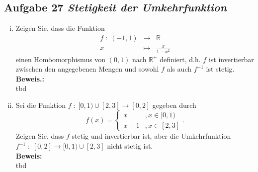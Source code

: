 \subsection*{Aufgabe 27 \mdseries\itshape Stetigkeit der Umkehrfunktion}

\begin{enumerate}[(i)]
   \item Zeigen Sie, dass die Funktion 
        $$\begin{array}{rcl}
            f \; : \; (-1,1) &\longrightarrow& \mathbb{R}\\
                x & \mapsto & \frac{x}{1 - x^2}
        \end{array}$$
        einen Homöomorphismus von $(0,1)$ nach $\mathbb{R}^+$ definiert, d.h. 
        $f$ ist invertierbar zwischen den angegebenen Mengen und sowohl $f$ als auch
        $f^{-1}$ ist stetig.\\

    \textbf{Beweis.:}\\
        tbd

    \item Sei die Funktion $f \; : \; [0,1) \cup [2,3] \rightarrow [0,2]$ gegeben durch
        $$
            f(x) = \left\{ \begin{array}{lr}
                x &, x\in [0,1)\\
                x-1 &, x \in [2,3]
            \end{array} \right. .
        $$
        Zeigen Sie, dass $f$ stetig und invertierbar ist, aber die Umkehrfunktion 
        $f^{-1} \; : \; [0,2] \rightarrow [0,1) \cup [2,3]$ nicht stetig ist.\\

    \textbf{Beweis:}\\
        tbd
\end{enumerate}
